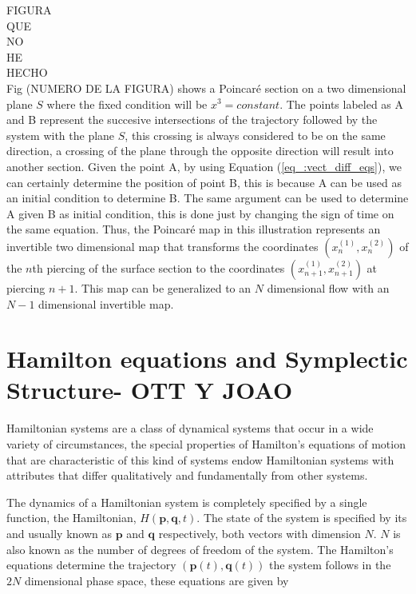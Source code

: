 FIGURA\\
QUE\\
NO\\
HE\\
HECHO\\

Fig (NUMERO DE LA FIGURA) shows a Poincaré section on a two dimensional plane $S$ where the fixed condition will be $x^{3}=constant$. The points labeled as A and B represent the succesive intersections of the trajectory followed by the system with the plane $S$, this crossing is always considered to be on the same direction, a crossing of the plane through the opposite direction will result into another section. Given the point A, by using Equation (\ref{eq_:vect_diff_eqs}), we can certainly determine the position of point B, this is because A can be used as an initial condition to determine B. The same argument can be used to determine A given B as initial condition, this is done just by changing the sign of time on the same equation. Thus, the Poincar\'e map in this illustration represents an invertible two dimensional map that transforms the coordinates $(x_n^{(1)},x_n^{(2)})$ of the $n$th piercing of the surface section to the coordinates $(x_{n+1}^{(1)},x_{n+1}^{(2)})$ at piercing $n+1$. This map can be generalized to an $N$ dimensional flow with an $N-1$ dimensional invertible map.

\section{Hamilton equations and Symplectic Structure- OTT Y JOAO}

Hamiltonian systems are a class of dynamical systems that occur in a wide variety of circumstances, the special properties of Hamilton's equations of motion that are characteristic of this kind of systems endow Hamiltonian systems with attributes that differ qualitatively and fundamentally from other systems.\par 

The dynamics of a Hamiltonian system is completely specified by a single function, the Hamiltonian, $H(\bm{p},\bm{q},t)$. The state of the system is specified by its  and  usually known as $\bm{p}$ and $\bm{q}$ respectively, both vectors with dimension $N$. $N$ is also known as the number of degrees of freedom of the system. The Hamilton's equations determine the trajectory $(\bm{p}(t),\bm{q}(t))$ the system follows in the $2N$ dimensional phase space, these equations are given by

